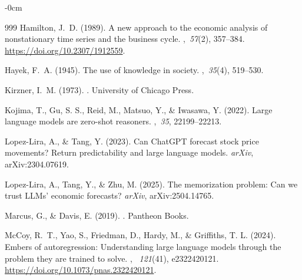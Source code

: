 \documentclass[jrfm,article,accept,moreauthors,pdftex]{Definitions/mdpi}
\begin{document}
\begin{adjustwidth}{-\extralength}{0cm}
\begin{thebibliography}{999}
Hamilton, J.~D. (1989).
\newblock A new approach to the economic analysis of nonstationary time series
  and the business cycle.
,~{\em 57\/}(2), 357--384.
\newblock
  \url{https://doi.org/10.2307/1912559}.

Hayek, F.~A. (1945).
\newblock The use of knowledge in society.
,~{\em 35\/}(4), 519--530.

Kirzner, I.~M. (1973).
.
\newblock University of Chicago Press.

Kojima, T., Gu, S. S., Reid, M., Matsuo, Y., \& Iwasawa, Y. (2022).
\newblock Large language models are zero-shot reasoners.
,~{\em 35},
  22199--22213.

Lopez-Lira, A., \& Tang, Y. (2023).
\newblock Can {ChatGPT} forecast stock price movements? {Return} predictability
  and large language models.
\newblock \textit{arXiv},  arXiv:2304.07619.

Lopez-Lira, A., Tang, Y., \& Zhu, M. (2025).
\newblock The memorization problem: Can we trust {LLMs}' economic forecasts?
\newblock \textit{arXiv},  arXiv:2504.14765.

Marcus, G., \& Davis, E. (2019).
.
\newblock Pantheon Books.

McCoy, R.~T., Yao, S., Friedman, D., Hardy, M., \& Griffiths, T. L.
(2024).
\newblock Embers of autoregression: Understanding large language models through
  the problem they are trained to solve.
,~{\em
  121\/}(41), e2322420121.
\newblock
  \url{https://doi.org/10.1073/pnas.2322420121}.


\end{thebibliography}
\end{adjustwidth}
\end{document}
